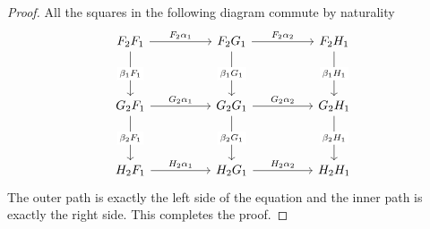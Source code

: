 \begin{proof}[Proof]
	All the squares in the following diagram commute by naturality
\[\begin{tikzcd}
	{F_2F_1} && {F_2G_1} && {F_2H_1} \\
	\\
	{G_2F_1} && {G_2G_1} && {G_2H_1} \\
	\\
	{H_2F_1} && {H_2G_1} && {H_2H_1}
	\arrow["{F_2\alpha_1}", from=1-1, to=1-3]
	\arrow["{\beta_1F_1}"{description}, from=1-1, to=3-1]
	\arrow["{F_2\alpha_2}", from=1-3, to=1-5]
	\arrow["{\beta_1G_1}"{description}, from=1-3, to=3-3]
	\arrow["{\beta_1 H_1}"{description}, from=1-5, to=3-5]
	\arrow["{G_2\alpha_1}", from=3-1, to=3-3]
	\arrow["{\beta_2F_1}"{description}, from=3-1, to=5-1]
	\arrow["{G_2\alpha_2}", from=3-3, to=3-5]
	\arrow["{\beta_2G_1}"{description}, from=3-3, to=5-3]
	\arrow["{\beta_2 H_1}"{description}, from=3-5, to=5-5]
	\arrow["{H_2\alpha_1}", from=5-1, to=5-3]
	\arrow["{H_2\alpha_2}", from=5-3, to=5-5]
\end{tikzcd}\]
The outer path is exactly the left side of the equation and 
the inner path is exactly the right side. This completes the proof.
\end{proof}

